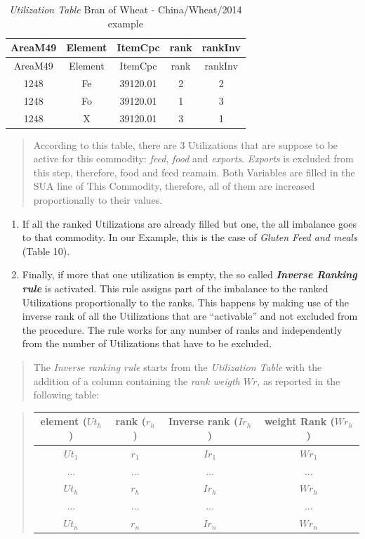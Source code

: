 \documentclass[]{article}
\begin{document}
\begin{longtable}[]{@{}ccccc@{}}
\caption{\emph{Utilization Table} Bran of Wheat - China/Wheat/2014
example}\tabularnewline
\toprule
AreaM49 & Element & ItemCpc & rank & rankInv\tabularnewline
\midrule
\endfirsthead
\toprule
AreaM49 & Element & ItemCpc & rank & rankInv\tabularnewline
\midrule
\endhead
1248 & Fe & 39120.01 & 2 & 2\tabularnewline
1248 & Fo & 39120.01 & 1 & 3\tabularnewline
1248 & X & 39120.01 & 3 & 1\tabularnewline
\bottomrule
\end{longtable}

\begin{quote}
According to this table, there are 3 Utilizations that are suppose to be
active for this commodity: \emph{feed}, \emph{food} and \emph{exports}.
\emph{Exports} is excluded from this step, therefore, food and feed
reamain. Both Variables are filled in the SUA line of This Commodity,
therefore, all of them are increased proportionally to their values.
\end{quote}

\begin{enumerate}
\def\labelenumi{\arabic{enumi}.}
\setcounter{enumi}{1}
\item
  If all the ranked Utilizations are already filled but one, the all
  imbalance goes to that commodity. In our Example, this is the case of
  \emph{Gluten Feed and meals} (Table 10).
\item
  Finally, if more that one utilization is empty, the so called
  \textbf{\emph{Inverse Ranking rule}} is activated. This rule assigns
  part of the imbalance to the ranked Utilizations proportionally to the
  ranks. This happens by making use of the inverse rank of all the
  Utilizations that are ``activable'' and not excluded from the
  procedure. The rule works for any number of ranks and independently
  from the number of Utilizations that have to be excluded.
\end{enumerate}

\begin{quote}
The \emph{Inverse ranking rule} starts from the \emph{Utilization Table}
with the addition of a column containing the \emph{rank weigth \(Wr\)},
as reported in the following table:
\end{quote}

\begin{quote}
\begin{center}
\begin{tabular}{ c|c|c|c } 
\hline
element ($Ut_{h}$) & rank ($r_{h}$) & Inverse rank ($Ir_{h}$) & weight Rank ($Wr_{h}$)\\
\hline
$Ut_{1}$ & $r_{1}$ & $Ir_{1}$  & $Wr_{1}$\\ 
... & ... & ... & ...\\ 
$Ut_{h}$ & $r_{h}$ & $Ir_{h}$  & $Wr_{h}$\\ 
... & ... & ... & ...\\ 
$Ut_{n}$ & $r_{n}$ & $Ir_{n}$  & $Wr_{n}$\\ 
\hline
\end{tabular}
\end{center}
\end{quote}
\end{document}
